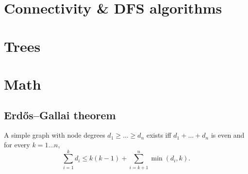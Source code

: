 \section{Connectivity \& DFS algorithms}

\section{Trees}

\section{Math}
	\subsection{Erdős–Gallai theorem}
		A simple graph with node degrees $d_1 \ge \dots \ge d_n$ exists iff $d_1 + \dots + d_n$ is even and for every $k = 1\dots n$,
		\[ \sum _{i=1}^{k}d_{i}\leq k(k-1)+\sum _{i=k+1}^{n}\min(d_{i},k). \]